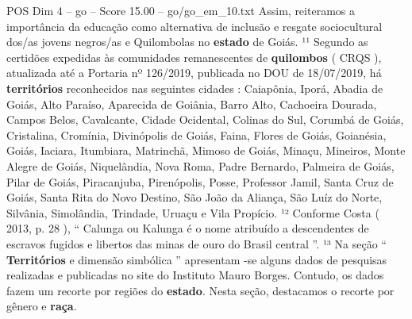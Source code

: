 \begin{textsample}{POS Dim 4 – go – Score 15.00 – go/go\_em\_10.txt}
Assim, reiteramos a importância da educação como alternativa de inclusão e resgate sociocultural dos/as jovens negros/as e Quilombolas no \textbf{estado} de Goiás. ¹¹ Segundo as certidões expedidas às comunidades remanescentes de \textbf{quilombos} ( CRQS ), atualizada até a Portaria nº 126/2019, publicada no DOU de 18/07/2019, há \textbf{territórios} reconhecidos nas seguintes cidades : Caiapônia, Iporá, Abadia de Goiás, Alto Paraíso, Aparecida de Goiânia, Barro Alto, Cachoeira Dourada, Campos Belos, Cavalcante, Cidade Ocidental, Colinas do Sul, Corumbá de Goiás, Cristalina, Cromínia, Divinópolis de Goiás, Faina, Flores de Goiás, Goianésia, Goiás, Iaciara, Itumbiara, Matrinchã, Mimoso de Goiás, Minaçu, Mineiros, Monte Alegre de Goiás, Niquelândia, Nova Roma, Padre Bernardo, Palmeira de Goiás, Pilar de Goiás, Piracanjuba, Pirenópolis, Posse, Professor Jamil, Santa Cruz de Goiás, Santa Rita do Novo Destino, São João da Aliança, São Luíz do Norte, Silvânia, Simolândia, Trindade, Uruaçu e Vila Propício. ¹² Conforme Costa ( 2013, p. 28 ), “ Calunga ou Kalunga é o nome atribuído a descendentes de escravos fugidos e libertos das minas de ouro do Brasil central ”. ¹³ Na seção “ \textbf{Territórios} e dimensão simbólica ” apresentam -se alguns dados de pesquisas realizadas e publicadas no site do Instituto Mauro Borges.
Contudo, os dados fazem um recorte por regiões do \textbf{estado}.
Nesta seção, destacamos o recorte por gênero e \textbf{raça}.

\end{textsample}
